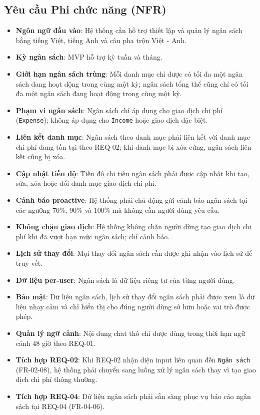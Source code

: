 \subsection{Yêu cầu Phi chức năng (NFR)}

\begin{itemize}
\item \textbf{Ngôn ngữ đầu vào}: Hệ thống cần hỗ trợ thiết lập và quản lý ngân sách bằng tiếng Việt, tiếng Anh và câu pha trộn Việt - Anh.
\item \textbf{Kỳ ngân sách}: MVP hỗ trợ kỳ tuần và tháng.
\item \textbf{Giới hạn ngân sách trùng}: Mỗi danh mục chỉ được có tối đa một ngân sách đang hoạt động trong cùng một kỳ; ngân sách tổng thể cũng chỉ có tối đa một ngân sách đang hoạt động trong cùng một kỳ.
\item \textbf{Phạm vi ngân sách}: Ngân sách chỉ áp dụng cho giao dịch chi phí (\texttt{Expense}); không áp dụng cho \texttt{Income} hoặc giao dịch đặc biệt.
\item \textbf{Liên kết danh mục}: Ngân sách theo danh mục phải liên kết với danh mục chi phí đang tồn tại theo REQ-02; khi danh mục bị xóa cứng, ngân sách liên kết cũng bị xóa.
\item \textbf{Cập nhật tiến độ}: Tiến độ chi tiêu ngân sách phải được cập nhật khi tạo, sửa, xóa hoặc đổi danh mục giao dịch chi phí.
\item \textbf{Cảnh báo proactive}: Hệ thống phải chủ động gửi cảnh báo ngân sách tại các ngưỡng 70\%, 90\% và 100\% mà không cần người dùng yêu cầu.
\item \textbf{Không chặn giao dịch}: Hệ thống không chặn người dùng tạo giao dịch chi phí khi đã vượt hạn mức ngân sách; chỉ cảnh báo.
\item \textbf{Lịch sử thay đổi}: Mọi thay đổi ngân sách cần được ghi nhận vào lịch sử để truy vết.
\item \textbf{Dữ liệu per-user}: Ngân sách là dữ liệu riêng tư của từng người dùng.
\item \textbf{Bảo mật}: Dữ liệu ngân sách, lịch sử thay đổi ngân sách phải được xem là dữ liệu nhạy cảm và chỉ hiển thị cho đúng người dùng sở hữu hoặc vai trò được phép.
\item \textbf{Quản lý ngữ cảnh}: Nội dung chat thô chỉ được dùng trong thời hạn ngữ cảnh 48 giờ theo REQ-01.
\item \textbf{Tích hợp REQ-02}: Khi REQ-02 nhận diện input liên quan đến \texttt{Ngân sách} (FR-02-08), hệ thống phải chuyển sang luồng xử lý ngân sách thay vì tạo giao dịch chi phí thông thường.
\item \textbf{Tích hợp REQ-04}: Dữ liệu ngân sách phải sẵn sàng phục vụ báo cáo ngân sách tại REQ-04 (FR-04-06).
\end{itemize}

